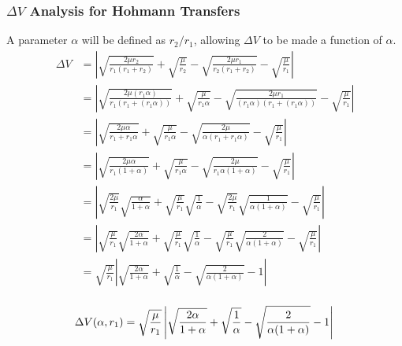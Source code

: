 \documentclass[../main.tex]{subfiles}
\begin{document}
\subsubsection{\texorpdfstring{$\Delta V$}{DeltaV} Analysis for Hohmann Transfers}

A parameter $\alpha$ will be defined as $r_2/r_1$, allowing $\Delta V$ to be made a function of $\alpha$.
\begin{align*}
    \Delta V & = \left|\sqrt{\frac{2\mu{}r_2}{r_1(r_1+r_2)}}+\sqrt{\frac{\mu}{r_2}}-\sqrt{\frac{2\mu{}r_1}{r_2(r_1+r_2)}}-\sqrt{\frac{\mu}{r_1}}\right|                                                           \\
             & = \left|\sqrt{\frac{2\mu{}(r_1\alpha)}{r_1(r_1+(r_1\alpha))}}+\sqrt{\frac{\mu}{r_1\alpha}}-\sqrt{\frac{2\mu{}r_1}{(r_1\alpha)(r_1+(r_1\alpha))}}-\sqrt{\frac{\mu}{r_1}}\right|                     \\
             & = \left|\sqrt{\frac{2\mu\alpha}{r_1+r_1\alpha}}+\sqrt{\frac{\mu}{r_1\alpha}}-\sqrt{\frac{2\mu}{\alpha(r_1+r_1\alpha)}}-\sqrt{\frac{\mu}{r_1}}\right|                                               \\
             & = \left|\sqrt{\frac{2\mu\alpha}{r_1(1+\alpha)}}+\sqrt{\frac{\mu}{r_1\alpha}}-\sqrt{\frac{2\mu}{r_1\alpha(1+\alpha)}}-\sqrt{\frac{\mu}{r_1}}\right|                                                 \\
             & = \left|\sqrt{\frac{2\mu}{r_1}}\sqrt{\frac{\alpha}{1+\alpha}}+\sqrt{\frac{\mu}{r_1}}\sqrt{\frac{1}{\alpha}}-\sqrt{\frac{2\mu}{r_1}}\sqrt{\frac{1}{\alpha(1+\alpha)}}-\sqrt{\frac{\mu}{r_1}}\right| \\
             & = \left|\sqrt{\frac{\mu}{r_1}}\sqrt{\frac{2\alpha}{1+\alpha}}+\sqrt{\frac{\mu}{r_1}}\sqrt{\frac{1}{\alpha}}-\sqrt{\frac{\mu}{r_1}}\sqrt{\frac{2}{\alpha(1+\alpha)}}-\sqrt{\frac{\mu}{r_1}}\right|  \\
             & = \sqrt{\frac{\mu}{r_1}}\left|\sqrt{\frac{2\alpha}{1+\alpha}}+\sqrt{\frac{1}{\alpha}}-\sqrt{\frac{2}{\alpha(1+\alpha)}}-1\right|                                                                   \\
\end{align*}

\begin{equation}\label{Delta V in terms of Alpha Hohmann}
    \Delta V(\alpha, r_1) = \sqrt{\frac{\mu}{r_1}}\left|\sqrt{\frac{2\alpha}{1+\alpha}}+\sqrt{\frac{1}{\alpha}}-\sqrt{\frac{2}{\alpha(1+\alpha)}}-1\right|\\
\end{equation}
\end{document}
